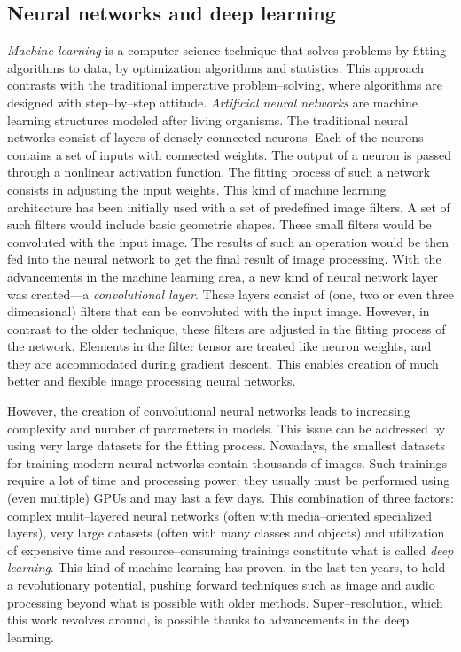 \subsection{Neural networks and deep learning}
\textit{Machine learning} is a computer science technique that solves problems by fitting algorithms to data, by optimization algorithms and statistics.
This approach contrasts with the traditional imperative problem--solving, where algorithms are designed with step--by--step attitude.
\textit{Artificial neural networks} are machine learning structures modeled after living organisms.
The traditional neural networks consist of layers of densely connected neurons.
Each of the neurons contains a set of inputs with connected weights.
The output of a neuron is passed through a nonlinear activation function.
The fitting process of such a network consists in adjusting the input weights.
This kind of machine learning architecture has been initially used with a set of predefined image filters.
A set of such filters would include basic geometric shapes.
These small filters would be convoluted with the input image.
The results of such an operation would be then fed into the neural network to get the final result of image processing.
With the advancements in the machine learning area, a new kind of neural network layer was created---a \textit{convolutional layer}.
These layers consist of (one, two or even three dimensional) filters that can be convoluted with the input image.
However, in  contrast to the older technique, these filters are adjusted in the fitting process of the network.
Elements in the filter tensor are treated like neuron weights, and they are accommodated during gradient descent.
This enables creation of much better and flexible image processing neural networks.

However, the creation of convolutional neural networks leads to increasing complexity and number of parameters in models.
This issue can be addressed by using very large datasets for the fitting process.
Nowadays, the smallest datasets for training modern neural networks contain thousands of images.
Such trainings require a lot of time and processing power; they usually must be performed using (even multiple) GPUs and may last a few days.
This combination of three factors: complex mulit--layered neural networks (often with media--oriented specialized layers), very large datasets (often with many classes and objects) and utilization of expensive time and resource--consuming trainings constitute what is called \textit{deep learning}.
This kind of machine learning has proven, in the last ten years, to hold a revolutionary potential, pushing forward techniques such as image and audio processing beyond what is possible with older methods.
Super--resolution, which this work revolves around, is possible thanks to advancements in the deep learning.

